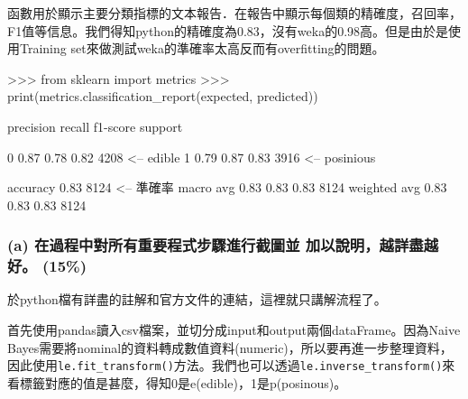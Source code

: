 \documentclass[11pt]{article}
\newenvironment{Shaded}{}{}
\newcommand{\DecValTok}[1]{\textcolor[rgb]{0.25,0.63,0.44}{{#1}}}
\newcommand{\FloatTok}[1]{\textcolor[rgb]{0.25,0.63,0.44}{{#1}}}
\newcommand{\NormalTok}[1]{{#1}}
\newcommand{\ImportTok}[1]{{#1}}
\newcommand{\OperatorTok}[1]{\textcolor[rgb]{0.40,0.40,0.40}{{#1}}}
\newcommand{\BuiltInTok}[1]{{#1}}
\begin{document}
函數用於顯示主要分類指標的文本報告．在報告中顯示每個類的精確度，召回率，F1值等信息。我們得知python的精確度為0.83，沒有weka的0.98高。但是由於是使用Training
set來做測試weka的準確率太高反而有overfitting的問題。

\begin{Shaded}
\begin{Highlighting}[]
\OperatorTok{>>>} \ImportTok{from}\NormalTok{ sklearn }\ImportTok{import}\NormalTok{ metrics}
\OperatorTok{>>>} \BuiltInTok{print}\NormalTok{(metrics.classification_report(expected, predicted))}

\NormalTok{              precision    recall  f1}\OperatorTok{-}\NormalTok{score   support}

           \DecValTok{0}       \FloatTok{0.87}      \FloatTok{0.78}      \FloatTok{0.82}      \DecValTok{4208} \OperatorTok{<--}\NormalTok{ edible}
           \DecValTok{1}       \FloatTok{0.79}      \FloatTok{0.87}      \FloatTok{0.83}      \DecValTok{3916} \OperatorTok{<--}\NormalTok{ posinious}

\NormalTok{    accuracy                           }\FloatTok{0.83}      \DecValTok{8124} \OperatorTok{<--}\NormalTok{ 準確率}
\NormalTok{   macro avg       }\FloatTok{0.83}      \FloatTok{0.83}      \FloatTok{0.83}      \DecValTok{8124}
\NormalTok{weighted avg       }\FloatTok{0.83}      \FloatTok{0.83}      \FloatTok{0.83}      \DecValTok{8124}
\end{Highlighting}
\end{Shaded}

    \subsubsection{(a) 在過程中對所有重要程式步驟進行截圖並
加以說明，越詳盡越好。
(15\%)}\label{a-ux5728ux904eux7a0bux4e2dux5c0dux6240ux6709ux91cdux8981ux7a0bux5f0fux6b65ux9a5fux9032ux884cux622aux5716ux4e26-ux52a0ux4ee5ux8aaaux660eux8d8aux8a73ux76e1ux8d8aux597d-15}

於python檔有詳盡的註解和官方文件的連結，這裡就只講解流程了。

首先使用pandas讀入csv檔案，並切分成input和output兩個dataFrame。因為Naive
Bayes需要將nominal的資料轉成數值資料(numeric)，所以要再進一步整理資料，因此使用\texttt{le.fit\_transform()}方法。我們也可以透過\texttt{le.inverse\_transform()}來看標籤對應的值是甚麼，得知0是e(edible)，1是p(posinous)。


    
    
    
    
\end{document}
